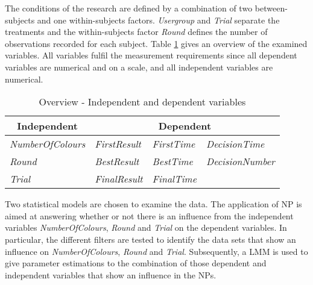 The conditions of the research are defined by a combination of two between-subjects and one within-subjects factors. \textit{Usergroup} and \textit{Trial} separate the treatments and the within-subjects factor \textit{Round} defines the number of observations recorded for each subject.
Table \ref{tab:OverviewVariables} gives an overview of the examined variables. All variables fulfil the measurement requirements since all dependent variables are numerical and on a scale, and all independent variables are numerical.
\begin{table}
  \centering
    \begin{tabular}{l|lll}
    \toprule
    \multicolumn{1}{c|}{Independent}  & \multicolumn{3}{c}{Dependent} \\
    \midrule
    \textit{NumberOfColours} & \textit{FirstResult} & \textit{FirstTime} & \textit{DecisionTime}\\
    \textit{Round} & \textit{BestResult} & \textit{BestTime} & \textit{DecisionNumber}\\
    \textit{Trial} & \textit{FinalResult} & \textit{FinalTime}\\
    \bottomrule
    \end{tabular}%
      \caption{Overview - Independent and dependent variables}
    \label{tab:OverviewVariables}%
\end{table}%

Two statistical models are chosen to examine the data. The application of \acf{NP} is aimed at answering whether or not there is an influence from the independent variables \textit{NumberOfColours}, \textit{Round} and \textit{Trial} on the dependent variables. In particular, the different filters are tested to identify the data sets that show an influence on \textit{NumberOfColours}, \textit{Round} and \textit{Trial}. Subsequently, a \acf{LMM} is used to give parameter estimations to the combination of those dependent and independent variables that show an influence in the \ac{NP}s.



